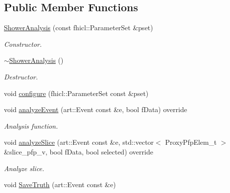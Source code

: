\subsection*{Public Member Functions}
\begin{DoxyCompactItemize}
\item 
\hyperlink{classanalysis_1_1ShowerAnalysis_a6ea40aa403312ba7acc5434c1c66df63}{Shower\-Analysis} (const fhicl\-::\-Parameter\-Set \&pset)
\begin{DoxyCompactList}\small\item\em Constructor. \end{DoxyCompactList}\item 
\hypertarget{classanalysis_1_1ShowerAnalysis_af16c1759f0122ba30f7839c4003c0df7}{\hyperlink{classanalysis_1_1ShowerAnalysis_af16c1759f0122ba30f7839c4003c0df7}{$\sim$\-Shower\-Analysis} ()}\label{classanalysis_1_1ShowerAnalysis_af16c1759f0122ba30f7839c4003c0df7}

\begin{DoxyCompactList}\small\item\em Destructor. \end{DoxyCompactList}\item 
void \hyperlink{classanalysis_1_1ShowerAnalysis_a973cb90e6fa423b88ca3a9667d467b1e}{configure} (fhicl\-::\-Parameter\-Set const \&pset)
\item 
void \hyperlink{classanalysis_1_1ShowerAnalysis_a5ae15109590ea737320bf13cefa5cc3f}{analyze\-Event} (art\-::\-Event const \&e, bool f\-Data) override
\begin{DoxyCompactList}\small\item\em Analysis function. \end{DoxyCompactList}\item 
\hypertarget{classanalysis_1_1ShowerAnalysis_a957be06c08e5777cd684c84ca53bc45e}{void \hyperlink{classanalysis_1_1ShowerAnalysis_a957be06c08e5777cd684c84ca53bc45e}{analyze\-Slice} (art\-::\-Event const \&e, std\-::vector$<$ Proxy\-Pfp\-Elem\-\_\-t $>$ \&slice\-\_\-pfp\-\_\-v, bool f\-Data, bool selected) override}\label{classanalysis_1_1ShowerAnalysis_a957be06c08e5777cd684c84ca53bc45e}

\begin{DoxyCompactList}\small\item\em Analyze slice. \end{DoxyCompactList}\item 
\hypertarget{classanalysis_1_1ShowerAnalysis_a0753806916baaf34f1ab0efa0dc4f4cc}{void \hyperlink{classanalysis_1_1ShowerAnalysis_a0753806916baaf34f1ab0efa0dc4f4cc}{Save\-Truth} (art\-::\-Event const \&e)}\label{classanalysis_1_1ShowerAnalysis_a0753806916baaf34f1ab0efa0dc4f4cc}


\end{DoxyCompactItemize}
